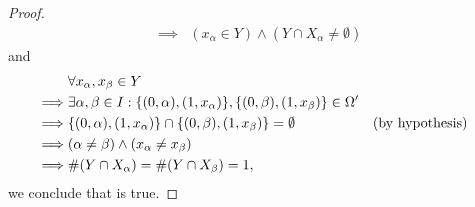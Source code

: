 \begin{proof}
\begin{align*}
    \implies & (x_\alpha \in Y) \land (Y \cap X_{\alpha} \neq \emptyset)
  \end{align*}
  and
  \begin{align*}
             & \forall x_{\alpha}, x_{\beta} \in Y                                                                                                        \\
    \implies & \exists \alpha, \beta \in I : \set{(0, \alpha), (1, x_{\alpha})}, \set{(0, \beta), (1, x_{\beta})} \in \Omega'                             \\
    \implies & \set{(0, \alpha), (1, x_{\alpha})} \cap \set{(0, \beta), (1, x_{\beta})} = \emptyset                           &  & \text{(by hypothesis)} \\
    \implies & (\alpha \neq \beta) \land (x_{\alpha} \neq x_{\beta})                                                                                      \\
    \implies & \#(Y \cap X_{\alpha}) = \#(Y \cap X_{\beta}) = 1,
  \end{align*}
  we conclude that  is true.
\end{proof}
